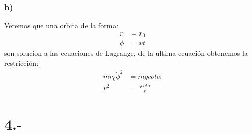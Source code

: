 \documentclass{article}
\begin{document}
\begin{tcolorbox}[breakable]
    \subsubsection*{b)}
    Veremos que una orbita de la forma:
    \begin{align*}
        r &= r_0 \\
        \phi &= vt
    \end{align*}
    son solucion a las ecuaciones de Lagrange, de la ultima ecuación obtenemos la restricción:
    \begin{align*}
        mr_0\dot{\phi}^2 &= mgcot\alpha \\
        v^2 &= \frac{gcot\alpha}{r} 
    \end{align*}
\end{tcolorbox}

\section*{4.-}
\end{document}
